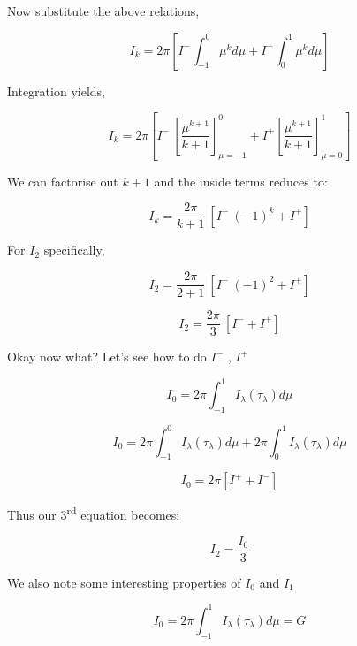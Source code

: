 \documentclass[12pt]{article}
\renewcommand{\_}{\kern-1.5pt\textunderscore\kern-1.5pt}
\begin{document}
\begin{itemize}
Now substitute the above relations,\par

 \[ I_{k}=2 \pi   \left[ I^{-} \int _{-1}^{0} \mu ^{k} d \mu +I^{+} \int _{0}^{1} \mu ^{k} d \mu  \right]  \] \par

Integration yields,\par

 \[ I_{k}=2 \pi   \left[ I^{-}~ \left[ \frac{ \mu ^{k+1}}{k+1 } \right] _{ \mu =-1}^{0}+I^{+} \left[ \frac{ \mu ^{k+1}}{k+1 } \right] _{ \mu =0}^{1} \right]  \] \par

We can factorise out  \( k+1  \) and the inside terms reduces to:\par

 \[ I_{k}=\frac{2 \pi }{k+1}~ \left[ I^{-}~ \left( -1 \right) ^{k}+I^{+} \right]  \] \par

For  \( I_{2} \)  specifically,\par

 \[ I_{2}=\frac{2 \pi }{2+1}~ \left[ I^{-}~ \left( -1 \right) ^{2}+I^{+} \right]  \] \par

 \[ I_{2}=\frac{2 \pi }{3}~ \left[ I^{-}+I^{+} \right]  \] \par

Okay now what? Let’s see how to do  \( I^{-} \) ,  \( I^{+} \) \par

 \[ I_{0}=2 \pi   \int _{-1}^{1}I_{ \lambda } \left(  \tau_{ \lambda } \right)  d \mu  \] \par

 \[ I_{0}=2 \pi   \int _{-1}^{0}I_{ \lambda } \left(  \tau_{ \lambda } \right)  d \mu +2 \pi   \int _{0}^{1}I_{ \lambda } \left(  \tau_{ \lambda } \right)  d \mu  \] \par

 \[ I_{0}=2 \pi   \left[ I^{+}+I^{-} \right]  \] \par

Thus our 3\textsuperscript{rd} equation becomes:\par

 \[ I_{2}=\frac{I_{0}}{3} \] \par

We also note some interesting properties of  \( I_{0} \)  and  \( I_{1} \) \par

 \[ I_{0}=2 \pi  \int _{-1}^{1}I_{ \lambda } \left(  \tau_{ \lambda } \right) d \mu =G \] \par


\end{itemize}
\end{document}
